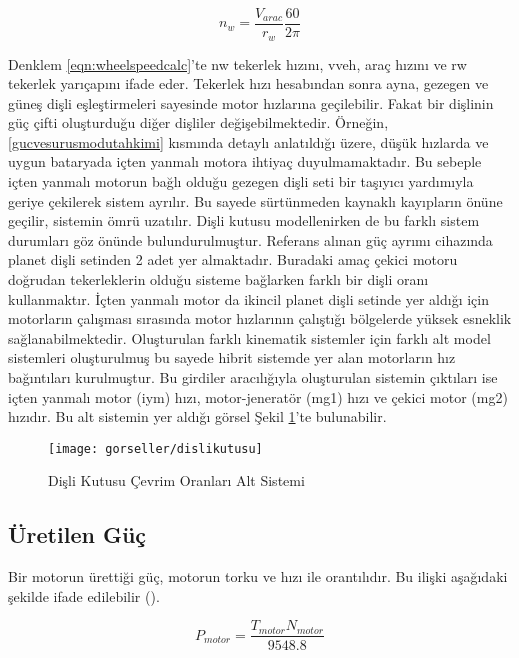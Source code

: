 \begin{equation}
    n_{w}=\frac{V_{arac}}{r_{w}}\frac{60}{2\pi}
    \label{eqn:wheelspeedcalc}
\end{equation}

Denklem \ref{eqn:wheelspeedcalc}'te \acrshort{nw} tekerlek hızını, \acrshort{vveh}, araç hızını ve \acrshort{rw} tekerlek yarıçapını ifade eder. Tekerlek hızı hesabından sonra ayna, gezegen ve güneş dişli eşleştirmeleri sayesinde 
motor hızlarına geçilebilir. Fakat bir dişlinin güç çifti oluşturduğu diğer dişliler değişebilmektedir. Örneğin, \ref{gucvesurusmodutahkimi} kısmında detaylı anlatıldığı üzere, düşük hızlarda ve uygun bataryada içten yanmalı motora ihtiyaç duyulmamaktadır.
Bu sebeple içten yanmalı motorun bağlı olduğu gezegen dişli seti bir taşıyıcı yardımıyla geriye çekilerek sistem ayrılır. Bu sayede sürtünmeden kaynaklı kayıpların önüne geçilir, sistemin ömrü uzatılır.
Dişli kutusu modellenirken de bu farklı sistem durumları göz önünde bulundurulmuştur. Referans alınan güç ayrımı cihazında planet dişli setinden 2 adet yer almaktadır. Buradaki amaç çekici motoru doğrudan tekerleklerin olduğu sisteme bağlarken farklı bir dişli oranı kullanmaktır. İçten yanmalı motor da ikincil planet dişli setinde yer aldığı için 
motorların çalışması sırasında motor hızlarının çalıştığı bölgelerde yüksek esneklik sağlanabilmektedir.
Oluşturulan farklı kinematik sistemler için farklı alt model sistemleri oluşturulmuş bu sayede hibrit sistemde yer alan motorların hız bağıntıları kurulmuştur.
Bu girdiler aracılığıyla oluşturulan sistemin çıktıları ise içten yanmalı motor (\acrshort{iym}) hızı, motor-jeneratör (\acrshort{mg1}) hızı ve çekici motor (\acrshort{mg2}) hızıdır. 
Bu alt sistemin yer aldığı görsel Şekil \ref{fig:dislikutusu}'te bulunabilir.

\begin{figure}[h]
    \centering
    \texttt{[image: gorseller/dislikutusu]}
    \caption{Dişli Kutusu Çevrim Oranları Alt Sistemi}\label{fig:dislikutusu}
\end{figure}

\subsection{Üretilen Güç}

Bir motorun ürettiği güç, motorun torku ve hızı ile orantılıdır. Bu ilişki aşağıdaki şekilde ifade edilebilir (\cite{Heywood}). 

\begin{equation}
    P_{motor}=\frac{T_{motor}N_{motor}}{9548.8}
    \label{eqn:motortorkguc}
\end{equation}

